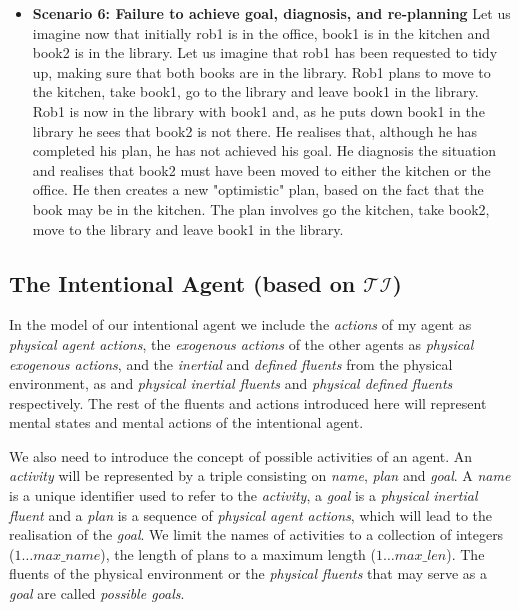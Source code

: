 \documentclass[11pt, oneside]{article}
\begin{document}
\begin{itemize}
\item \textbf{Scenario 6: Failure to achieve goal, diagnosis, and re-planning}\newline
Let us imagine now that initially rob1 is in the office, book1 is in the kitchen and book2 is in the library. Let us imagine that rob1 has been requested to tidy up, making sure that both books are in the library. Rob1 plans to move to the kitchen, take book1, go to the library and leave book1 in the library. Rob1 is now in the library with book1 and, as he puts down book1 in the library he sees that book2 is not there. He realises that, although he has completed his plan, he has not achieved his goal. He diagnosis the situation and realises that book2 must have been moved to either the kitchen or the office. He then creates a new "optimistic" plan, based on the fact that the book may be in the kitchen. The plan involves go the kitchen, take book2, move to the library and leave book1 in the library.  
\end{itemize}




\subsection{The Intentional Agent (based on $\mathcal{TI}$) }
In the model of our intentional agent we include the \emph{actions} of my agent as \emph{physical  agent  actions},  the \emph{exogenous actions} of the other agents as \emph{physical exogenous actions}, and the \emph{inertial} and \emph{defined fluents} from the physical environment, as  and \emph{physical  inertial  fluents} and \emph{physical defined fluents} respectively. The rest of the fluents and actions introduced here will represent mental states and mental actions of the intentional agent. 

We also need to introduce the concept of possible activities of an agent. An \emph{activity} will be represented by a triple consisting on \emph{name}, \emph{plan} and \emph{goal}. A \emph{name} is a unique identifier used to refer to the \emph{activity}, a \emph{goal} is a \emph{physical inertial  fluent} and a \emph{plan} is a sequence of \emph{physical agent  actions}, which will lead to the realisation of the \emph{goal}.  We limit the names of activities to a collection of integers ($1\dots max\_name$), the length of plans to a maximum length ($1\dots max\_len$). The fluents of the physical environment  or the \emph{physical fluents} that may serve as a \emph{goal} are called \emph{possible  goals}. 
\end{document}
